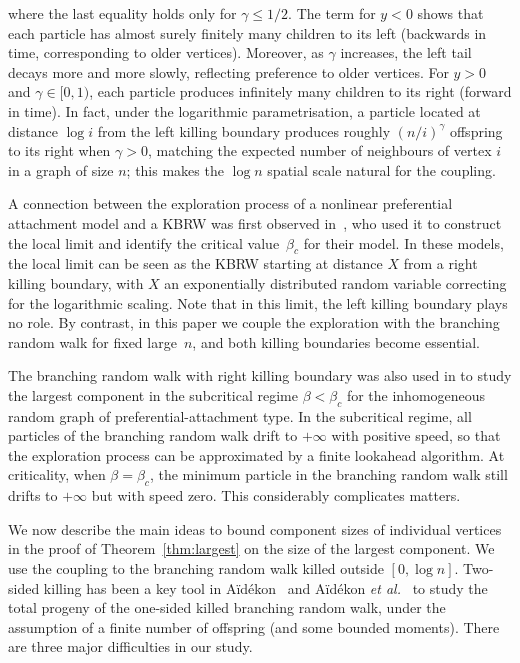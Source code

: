 \documentclass[a4paper, a4wide, 10pt, reqno]{amsart}
\theoremstyle{plain}
\theoremstyle{definition}
\numberwithin{equation}{section}
\begin{document}
where the last equality holds only for $\gamma\le1/2$.
The term for $y<0$ shows that each particle has almost surely finitely many children to its left (backwards in time, corresponding to older vertices). Moreover, as $\gamma$ increases, the left tail decays more and more slowly, reflecting preference to  older vertices. For $y>0$ and $\gamma\in[0,1)$, each particle produces  infinitely many children to its right (forward in time). In fact, under the logarithmic parametrisation, a particle located at distance $\log i$ from the left killing boundary produces roughly $(n/i)^\gamma$ offspring to its right when $\gamma>0$, matching the expected number of neighbours of vertex $i$ in a graph of size $n$; this  makes the $\log n$ spatial scale natural for the coupling. 

\smallskip
A connection between the exploration process of a nonlinear preferential attachment model and a KBRW was first observed in~\cite{DerMor13}, who used it to construct the local limit and identify the  critical value~$\beta_c$  for their model. In these models, the local limit can be seen as the KBRW starting at distance $X$ from a right killing boundary,  with $X$ an exponentially distributed random variable correcting for the logarithmic scaling. Note that in this limit, the left killing boundary plays no role. By contrast, in this paper we couple the exploration with the branching random walk for fixed large~$n$, and both killing boundaries become essential.  
\smallskip 

\pagebreak[3]
 The branching random walk with right killing boundary was also used in \cite{MS25} to study the largest component in the subcritical regime $\beta < \beta_c$ for the inhomogeneous random graph of preferential-attachment type.
 In the subcritical regime, all particles of the branching random walk drift to $+\infty$ with positive speed, so that the exploration process can be approximated by a finite lookahead algorithm. At criticality, when $\beta = \beta_c$,  the minimum particle in the branching random walk still drifts to $+\infty$ but with speed zero. This considerably complicates matters. \smallskip

We now describe the main ideas to bound component sizes of individual vertices in the proof of Theorem~\ref{thm:largest} on the size of the largest component. 
We use the coupling to the branching random walk killed outside $[0, \log n]$. 
Two-sided killing has been a key tool in
Aïdékon~\cite{aidekon2010tail} and Aïdékon \emph{et al.}~\cite{AidekonHuZindy}  to study the total progeny of the one-sided killed branching random walk, under the assumption of a finite number of offspring (and some bounded moments). There are three major difficulties in our study. 
\smallskip
\end{document}
